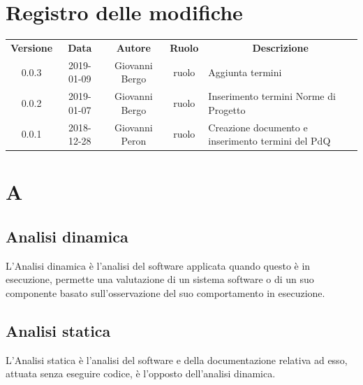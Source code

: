 \renewcommand {\footrulewidth}{0.2mm}

\usepackage{lipsum}

	
	\newpage
	\section*{\centering Registro delle modifiche}
	\begin{tabularx}{\textwidth}{ c | c | c | c | X }
		\rowcolor{LightBlue}
		\color{white}\bfseries Versione & \color{white}\bfseries Data & \color{white}\bfseries Autore & \color{white}\bfseries Ruolo & \multicolumn{1}{c}{\color{white}\bfseries Descrizione}\\[0.25cm]
		0.0.3 & 2019-01-09 & Giovanni Bergo & ruolo & Aggiunta termini \\ 
		\hline 
		0.0.2 & 2019-01-07 & Giovanni Bergo & ruolo & Inserimento termini Norme di Progetto \\ 
		\hline 
		0.0.1 & 2018-12-28 & Giovanni Peron & ruolo & Creazione documento e \newline inserimento termini del PdQ \\ 
		\hline
	
	\end{tabularx}
	\newpage
	\setcounter{secnumdepth}{0}
	
	
	\printindex
	\newpage
	\section{A}

	\subsection{Analisi dinamica} 
		L'Analisi dinamica è l'analisi del software applicata quando questo è in esecuzione, permette una valutazione di un sistema software o di un suo componente basato sull’osservazione del suo comportamento in esecuzione.
	
	\subsection{Analisi statica}
L'Analisi statica è l'analisi del software e della documentazione relativa ad esso, attuata senza eseguire codice, è l'opposto dell'analisi dinamica.
	
